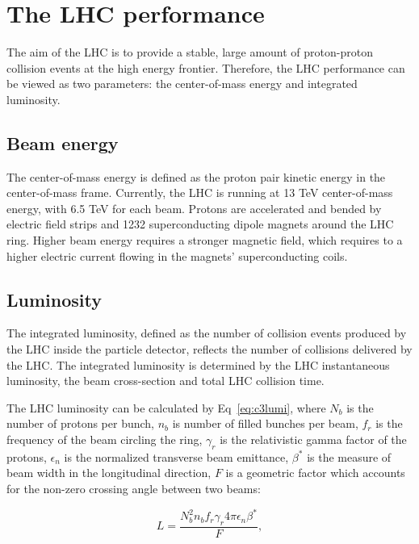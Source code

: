 \section{The LHC performance}
\label{sec:lhcs1}
\par The aim of the LHC is to provide a stable, large amount of proton-proton collision events at the high energy frontier. Therefore, the LHC performance can be viewed as two parameters: the center-of-mass energy and integrated luminosity.

\subsection{Beam energy}
\par The center-of-mass energy is defined as the proton pair kinetic energy in the center-of-mass frame. Currently, the LHC is running at 13 TeV center-of-mass energy, with 6.5 TeV for each beam. Protons are accelerated and bended by electric field strips and 1232 superconducting dipole magnets around the LHC ring. Higher beam energy requires a stronger magnetic field, which requires to a higher electric current flowing in the magnets' superconducting coils.

\subsection{Luminosity}
\par The integrated luminosity, defined as the number of collision events produced by the LHC inside the particle detector, reflects the number of collisions delivered by the LHC. The integrated luminosity is determined by the LHC instantaneous luminosity, the beam cross-section and total LHC collision time.

\par The LHC luminosity can be calculated by Eq~\ref{eq:c3lumi}, where $N_{b}$ is the number of protons per bunch, $n_{b}$ is number of filled bunches per beam, $f_{r}$ is the frequency of the beam circling the ring, $\gamma_{r}$ is the relativistic gamma factor of the protons, $\epsilon_{n}$ is the normalized transverse beam emittance, $\beta^{*}$ is the measure of beam width in the longitudinal direction, $F$ is a geometric factor which accounts for the non-zero crossing angle between two beams:

\begin{equation}
  L = \frac{N_{b}^{2}n_{b}f_{r}\gamma_{r}4\pi\epsilon_{n}\beta^{*}}{F},
  \label{eq:c3lumi}
\end{equation}

